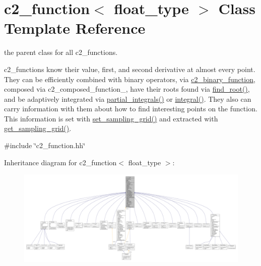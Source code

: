 \hypertarget{classc2__function}{}\section{c2\+\_\+function$<$ float\+\_\+type $>$ Class Template Reference}
\label{classc2__function}


the parent class for all c2\+\_\+functions.

c2\+\_\+functions know their value, first, and second derivative at almost every point. They can be efficiently combined with binary operators, via \hyperlink{classc2__binary__function}{c2\+\_\+binary\+\_\+function}, composed via c2\+\_\+composed\+\_\+function\+\_\+, have their roots found via \hyperlink{classc2__function_acd17a7191226578c866d82cb2e9ff89f}{find\+\_\+root()}, and be adaptively integrated via \hyperlink{classc2__function_a89ce5e2f44ebfaf9eb4d66605cde4fde}{partial\+\_\+integrals()} or \hyperlink{classc2__function_a675c5056562332be2e49b38485d322b7}{integral()}. They also can carry information with them about how to find \textquotesingle{}interesting\textquotesingle{} points on the function. This information is set with \hyperlink{classc2__function_a23828c75121b442899ab7a80cf5abbb0}{set\+\_\+sampling\+\_\+grid()} and extracted with \hyperlink{classc2__function_ad03264dcc015e5d0b1b6eb30df3f32be}{get\+\_\+sampling\+\_\+grid()}.  




{\ttfamily \#include \char`\"{}c2\+\_\+function.\+hh\char`\"{}}



Inheritance diagram for c2\+\_\+function$<$ float\+\_\+type $>$\+:
\nopagebreak
\begin{figure}[H]
\begin{center}
\leavevmode
\includegraphics[width=350pt]{classc2__function__inherit__graph}
\end{center}
\end{figure}



